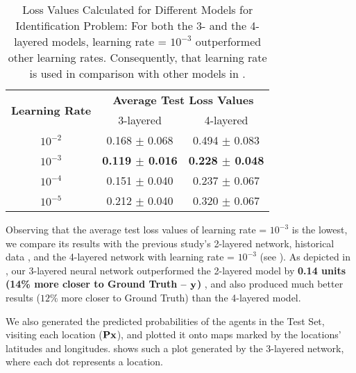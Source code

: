 \begin{table}[!htbp]
    \centering
    \caption[Loss Values Calculated for Different Models for Identification Problem]{Loss Values Calculated for Different Models for Identification Problem: For both the 3- and the 4-layered models, learning rate = $10^{-3}$ outperformed other learning rates. Consequently, that learning rate is used in comparison with other models in .}
    \label{tab:Loss Values Calculated for Different Models for Identification Problem}
    \begin{tabular}{c | c | c}
        \hline
        \multirow{2}{*}{\textbf{Learning Rate}} & \multicolumn{2}{c}{\textbf{Average Test Loss Values}} \\
        & 3-layered & 4-layered\\
        \hline
        $10^{-2}$ & 0.168 $\pm$ 0.068 & 0.494 $\pm$ 0.083\\
        $10^{-3}$ & \textbf{0.119 $\pm$ 0.016} & \textbf{0.228 $\pm$ 0.048}\\
        $10^{-4}$ & 0.151 $\pm$ 0.040 & 0.237 $\pm$ 0.067\\
        $10^{-5}$ & 0.212 $\pm$ 0.040 & 0.320 $\pm$ 0.067\\
        \hline
    \end{tabular}
\end{table}

Observing that the average test loss values of learning rate = $10^{-3}$ is the lowest, we compare its results with the previous study's 2-layered network, historical data \cite[Table~1]{Xue2016Avi2}, and the 4-layered network with learning rate = $10^{-3}$ (see ). As depicted in , our 3-layered neural network outperformed the 2-layered model by \textbf{0.14 units (14\% more closer to Ground Truth -- $\mathbf{y}$)} \cite[Table~1]{Xue2016Avi2}, and also produced much better results ($12\%$ more closer to Ground Truth) than the 4-layered model.

We also generated the predicted probabilities of the agents in the Test Set, visiting each location ($\mathbf{P}\mathbf{x}$), and plotted it onto maps marked by the locations' latitudes and longitudes.  shows such a plot generated by the 3-layered network, where each dot represents a location.

